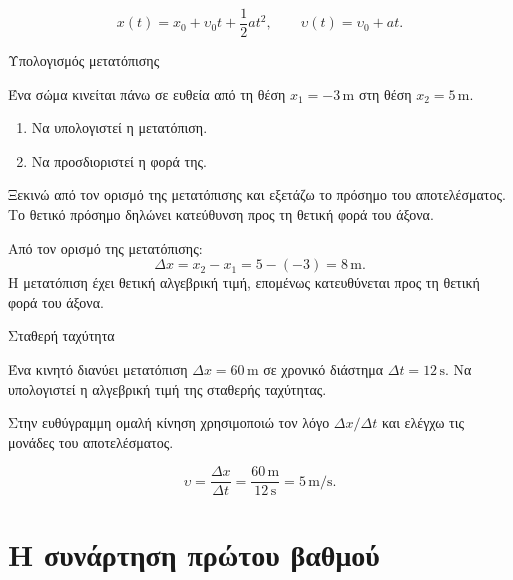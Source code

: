\[x(t)=x_0+\upsilon_0t+\frac12at^2,\qquad
  \upsilon(t)=\upsilon_0+at.\]


\clearpage

\begin{workedexample}{Υπολογισμός μετατόπισης}
\begin{ProblemBox}
Ένα σώμα κινείται πάνω σε ευθεία από τη θέση \(x_1=-3\,\mathrm{m}\) στη θέση \(x_2=5\,\mathrm{m}\).\par
\begin{enumerate}[label=\BookGreek*),leftmargin=7mm,topsep=1pt,itemsep=0pt]
\item Να υπολογιστεί η μετατόπιση.
\item Να προσδιοριστεί η φορά της.
\end{enumerate}
\end{ProblemBox}
\begin{ThinkBox}
Ξεκινώ από τον ορισμό της μετατόπισης και εξετάζω το πρόσημο του αποτελέσματος. Το θετικό πρόσημο δηλώνει κατεύθυνση προς τη θετική φορά του άξονα.
\end{ThinkBox}
\SolutionHeading
{} Από τον ορισμό της μετατόπισης:
\[\Delta x=x_2-x_1=5-(-3)=8\,\mathrm{m}.\]
 Η μετατόπιση έχει θετική αλγεβρική τιμή, επομένως κατευθύνεται προς τη θετική φορά του άξονα.
\end{workedexample}
\begin{workedexample}{Σταθερή ταχύτητα}
\begin{ProblemBox}
Ένα κινητό διανύει μετατόπιση \(\Delta x=60\,\mathrm{m}\) σε χρονικό διάστημα \(\Delta t=12\,\mathrm{s}\). Να υπολογιστεί η αλγεβρική τιμή της σταθερής ταχύτητας.
\end{ProblemBox}
\begin{ThinkBox}
Στην ευθύγραμμη ομαλή κίνηση χρησιμοποιώ τον λόγο \(\Delta x/\Delta t\) και ελέγχω τις μονάδες του αποτελέσματος.
\end{ThinkBox}
\SolutionHeading
\[\upsilon=\frac{\Delta x}{\Delta t}=\frac{60\,\mathrm{m}}{12\,\mathrm{s}}=5\,\mathrm{m/s}.\]
\end{workedexample}


\clearpage
\section{Η συνάρτηση πρώτου βαθμού}

